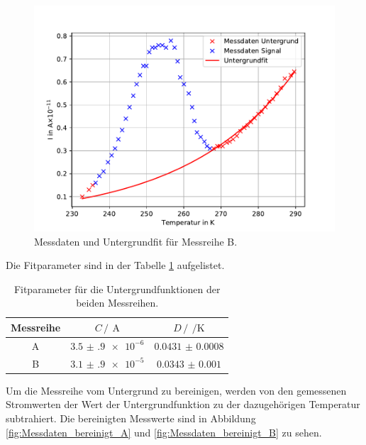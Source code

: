 \begin{figure}
    \centering
    \includegraphics[width =\textwidth, keepaspectratio]{figure/Untergrundfit_B.pdf}
    \caption{Messdaten und Untergrundfit für Messreihe B.}
    \label{fig:Untergrund_B}
\end{figure}
\FloatBarrier
Die Fitparameter sind in der Tabelle \ref{tab:Fit_params_untergrund} aufgelistet.
\begin{table}
    \centering
    \caption{Fitparameter für die Untergrundfunktionen der beiden Messreihen.}
    \label{tab:Fit_params_untergrund}
    \begin{tabular}{c c c}
        \toprule
        Messreihe &$C\,/\,\SI{}{\ampere}$&$D\,/\,\SI{}{\per\kelvin}$\\
        \midrule
        A&$\num{3.5(9)e-6}$&$\num{0.0431(8)}$\\
        B&$\num{3.1(9)e-5}$&$\num{0.0343(10)}$\\
        \bottomrule
    \end{tabular}
\end{table}
\FloatBarrier
Um die Messreihe vom Untergrund zu bereinigen, werden von den gemessenen Stromwerten der Wert der Untergrundfunktion 
zu der dazugehörigen Temperatur subtrahiert. Die bereinigten Messwerte sind in Abbildung \ref{fig:Messdaten_bereinigt_A}
und \ref{fig:Messdaten_bereinigt_B} zu sehen.
\FloatBarrier
